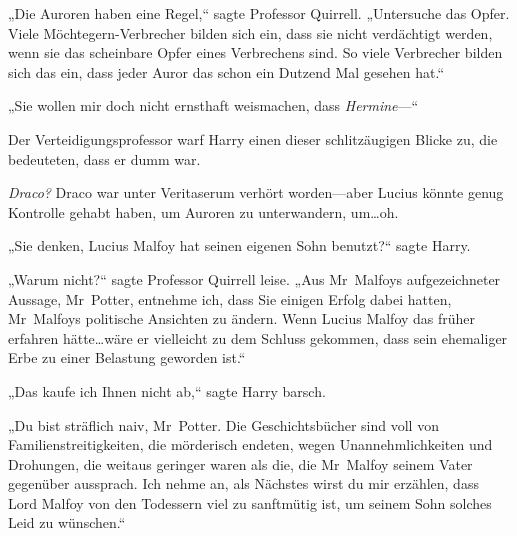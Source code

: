 „Die Auroren haben eine Regel,“ sagte Professor Quirrell. „Untersuche das Opfer. Viele Möchtegern-Verbrecher bilden sich ein, dass sie nicht verdächtigt werden, wenn sie das scheinbare Opfer eines Verbrechens sind. So viele Verbrecher bilden sich das ein, dass jeder Auror das schon ein Dutzend Mal gesehen hat.“

„Sie wollen mir doch nicht ernsthaft weismachen, dass \emph{Hermine}—“

Der Verteidigungsprofessor warf Harry einen dieser schlitzäugigen Blicke zu, die bedeuteten, dass er dumm war.

\emph{Draco?} Draco war unter Veritaserum verhört worden—aber Lucius könnte genug Kontrolle gehabt haben, um Auroren zu unterwandern, um…oh.

„Sie denken, Lucius Malfoy hat seinen eigenen Sohn benutzt?“ sagte Harry.

„Warum nicht?“ sagte Professor Quirrell leise. „Aus Mr~Malfoys aufgezeichneter Aussage, Mr~Potter, entnehme ich, dass Sie einigen Erfolg dabei hatten, Mr~Malfoys politische Ansichten zu ändern. Wenn Lucius Malfoy das früher erfahren hätte…wäre er vielleicht zu dem Schluss gekommen, dass sein ehemaliger Erbe zu einer Belastung geworden ist.“

„Das kaufe ich Ihnen nicht ab,“ sagte Harry barsch.

„Du bist sträflich naiv, Mr~Potter. Die Geschichtsbücher sind voll von Familienstreitigkeiten, die mörderisch endeten, wegen Unannehmlichkeiten und Drohungen, die weitaus geringer waren als die, die Mr~Malfoy seinem Vater gegenüber aussprach. Ich nehme an, als Nächstes wirst du mir erzählen, dass Lord Malfoy von den Todessern viel zu sanftmütig ist, um seinem Sohn solches Leid zu wünschen.“

